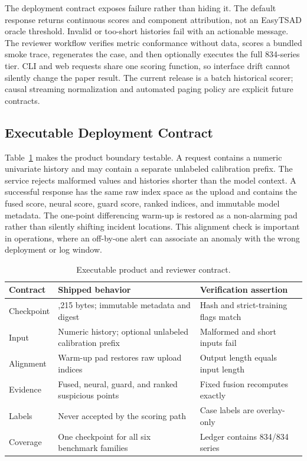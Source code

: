 The deployment contract exposes failure rather than hiding it. The default response returns continuous scores and component attribution, not an EasyTSAD oracle threshold. Invalid or too-short histories fail with an actionable message. The reviewer workflow verifies metric conformance without data, scores a bundled smoke trace, regenerates the case, and then optionally executes the full 834-series tier. CLI and web requests share one scoring function, so interface drift cannot silently change the paper result. The current release is a batch historical scorer; causal streaming normalization and automated paging policy are explicit future contracts.

\subsection{Executable Deployment Contract}

Table~\ref{tab:deployment-contract} makes the product boundary testable. A request contains a numeric univariate history and may contain a separate unlabeled calibration prefix. The service rejects malformed values and histories shorter than the model context. A successful response has the same raw index space as the upload and contains the fused score, neural score, guard score, ranked indices, and immutable model metadata. The one-point differencing warm-up is restored as a non-alarming pad rather than silently shifting incident locations. This alignment check is important in operations, where an off-by-one alert can associate an anomaly with the wrong deployment or log window.

\begin{table}[t]
\caption{Executable product and reviewer contract.}
\label{tab:deployment-contract}
\centering
\scriptsize
\setlength{\tabcolsep}{3.0pt}
\begin{tabular}{>{\raggedright\arraybackslash}p{}>{\raggedright\arraybackslash}p{}>{\raggedright\arraybackslash}p{}}
\toprule
Contract & Shipped behavior & Verification assertion \\
\midrule
Checkpoint & 145,215 bytes; immutable metadata and digest & Hash and strict-training flags match \\
Input & Numeric history; optional unlabeled calibration prefix & Malformed and short inputs fail \\
Alignment & Warm-up pad restores raw upload indices & Output length equals input length \\
Evidence & Fused, neural, guard, and ranked suspicious points & Fixed fusion recomputes exactly \\
Labels & Never accepted by the scoring path & Case labels are overlay-only \\
Coverage & One checkpoint for all six benchmark families & Ledger contains 834/834 series \\
\bottomrule
\end{tabular}
\end{table}

